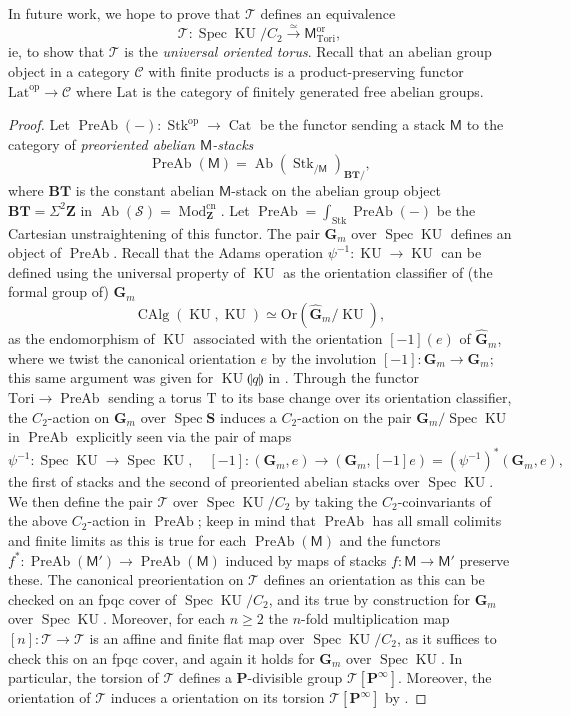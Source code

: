 \documentclass[11pt, a4paper]{article}
\newcommand{\llpar}{\llparenthesis}
\newcommand{\rrpar}{\rrparenthesis}
\newcommand{\cn}{\mathrm{cn}}
\newcommand{\ori}{\mathrm{or}}
\newcommand{\Ori}{\mathrm{Or}}
\DeclareMathOperator{\Spec}{Spec}
\newcommand{\1}{\mathbf{1}}
\DeclareMathOperator{\KU}{KU}
\newcommand{\Sph}{\mathbf{S}}
\DeclareMathOperator{\Ab}{Ab}
\DeclareMathOperator{\CAlg}{CAlg}
\DeclareMathOperator{\Cat}{Cat}
\DeclareMathOperator{\Mod}{Mod}
\newcommand{\Lat}{\mathrm{Lat}}
\DeclareMathOperator{\PreAb}{PreAb}
\DeclareMathOperator{\Stk}{Stk}
\newcommand{\Spc}{\mathcal{S}}
\newcommand{\Tori}{{\mathrm{Tori}}}
\newcommand{\op}{\mathrm{op}}
\newcommand{\BT}{\mathbf{BT}}
\newcommand{\calC}{\mathcal{C}}
\newcommand{\G}{\mathbf{G}}
\newcommand{\M}{\mathsf{M}}
\renewcommand{\P}{\mathbf{P}}
\newcommand{\T}{\mathrm{T}}
\newcommand{\calT}{\mathcal{T}}
\newcommand{\Z}{\mathbf{Z}}
\theoremstyle{plain}
\theoremstyle{definition}
\theoremstyle{remark}\numberwithin{equation}{section}
\begin{document}
In future work, we hope to prove that $\calT$ defines an equivalence
\[\calT \colon \Spec \KU / C_2 \xrightarrow{\simeq} \M_\Tori^\ori,\]
ie, to show that $\calT$ is the \emph{universal oriented torus}. Recall that an abelian group object in a category $\calC$ with finite products is a product-preserving functor $\Lat^\op \to \calC$ where $\Lat$ is the category of finitely generated free abelian groups.

\begin{proof}
    Let $\PreAb(-) \colon \Stk^\op \to \Cat$ be the functor sending a stack $\M$ to the category of \emph{preoriented abelian $\M$-stacks}
    \[\PreAb(\M) = \Ab(\Stk_{/\M})_{\BT/},\]
    where $\BT$ is the constant abelian $\M$-stack on the abelian group object $\BT = \Sigma^2 \Z$ in $\Ab(\Spc) = \Mod_\Z^\cn$. Let $\PreAb = \int_{\Stk} \PreAb(-)$ be the Cartesian unstraightening of this functor. The pair $\G_m$ over $\Spec \KU$ defines an object of $\PreAb$. Recall that the Adams operation $\psi^{-1} \colon \KU \to \KU$ can be defined using the universal property of $\KU$ as the orientation classifier of (the formal group of) $\G_m$
    \[\CAlg(\KU, \KU) \simeq \Ori(\widehat{\G}_m/\KU),\]
    as the endomorphism of $\KU$ associated with the orientation $[-1](e)$ of $\widehat{\G}_m$, where we twist the canonical orientation $e$ by the involution $[-1] \colon \G_m \to \G_m$; this same argument was given for $\KU\llpar q \rrpar$ in \cite[]{globaltate}. Through the functor $\Tori \to \PreAb$ sending a torus $\T$ to its base change over its orientation classifier, the $C_2$-action on $\G_m$ over $\Spec \Sph$ induces a $C_2$-action on the pair $\G_m/\Spec \KU$ in $\PreAb$ explicitly seen via the pair of maps
    \[\psi^{-1} \colon \Spec \KU \to \Spec \KU, \quad [-1] \colon (\G_m,e) \to (\G_m, [-1]e) = (\psi^{-1})^\ast(\G_m, e),\]
    the first of stacks and the second of preoriented abelian stacks over $\Spec \KU$. We then define the pair $\calT$ over $\Spec \KU / C_2$ by taking the $C_2$-coinvariants of the above $C_2$-action in $\PreAb$; keep in mind that $\PreAb$ has all small colimits and finite limits as this is true for each $\PreAb(\M)$ and the functors $f^\ast \colon \PreAb(\M') \to \PreAb(\M)$ induced by maps of stacks $f\colon \M \to \M'$ preserve these. The canonical preorientation on $\calT$ defines an orientation as this can be checked on an fpqc cover of $\Spec \KU /C_2$, and its true by construction for $\G_m$ over $\Spec \KU$. Moreover, for each $n\geq2$ the $n$-fold multiplication map $[n] \colon \calT \to \calT$ is an affine and finite flat map over $\Spec \KU / C_2$, as it suffices to check this on an fpqc cover, and again it holds for $\G_m$ over $\Spec \KU$. In particular, the torsion of $\calT$ defines a $\P$-divisible group $\calT[\P^\infty]$. Moreover, the orientation of $\calT$ induces a orientation on its torsion $\calT[\P^\infty]$ by \cite[Pr.6.1]{elltempcomp}.
\end{proof}
\end{document}
